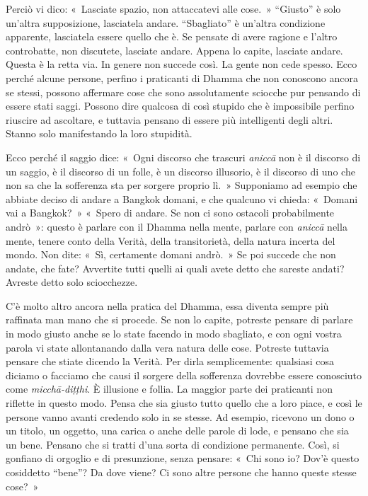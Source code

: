 Perciò vi dico: «~Lasciate spazio, non attaccatevi alle cose.~»
``Giusto'' è solo un'altra supposizione, lasciatela andare.
``Sbagliato'' è un'altra condizione apparente, lasciatela essere quello
che è. Se pensate di avere ragione e l'altro controbatte, non discutete,
lasciate andare. Appena lo capite, lasciate andare. Questa è la retta
via. In genere non succede così. La gente non cede spesso. Ecco perché
alcune persone, perfino i praticanti di Dhamma che non conoscono ancora
se stessi, possono affermare cose che sono assolutamente sciocche pur
pensando di essere stati saggi. Possono dire qualcosa di così stupido
che è impossibile perfino riuscire ad ascoltare, e tuttavia pensano di
essere più intelligenti degli altri. Stanno solo manifestando la loro
stupidità.

Ecco perché il saggio dice: «~Ogni discorso che trascuri \emph{aniccā}
non è il discorso di un saggio, è il discorso di un folle, è un discorso
illusorio, è il discorso di uno che non sa che la sofferenza sta per
sorgere proprio lì.~» Supponiamo ad esempio che abbiate deciso di andare
a Bangkok domani, e che qualcuno vi chieda: «~Domani vai a Bangkok?~»
«~Spero di andare. Se non ci sono ostacoli probabilmente andrò~»: questo
è parlare con il Dhamma nella mente, parlare con \emph{aniccā} nella
mente, tenere conto della Verità, della transitorietà, della natura
incerta del mondo. Non dite: «~Sì, certamente domani andrò.~» Se poi
succede che non andate, che fate? Avvertite tutti quelli ai quali avete
detto che sareste andati? Avreste detto solo sciocchezze.

C'è molto altro ancora nella pratica del Dhamma, essa diventa sempre più
raffinata man mano che si procede. Se non lo capite, potreste pensare di
parlare in modo giusto anche se lo state facendo in modo sbagliato, e
con ogni vostra parola vi state allontanando dalla vera natura delle
cose. Potreste tuttavia pensare che stiate dicendo la Verità. Per dirla
semplicemente: qualsiasi cosa diciamo o facciamo che causi il sorgere
della sofferenza dovrebbe essere conosciuto come \emph{micchā-diṭṭhi}. È
illusione e follia. La maggior parte dei praticanti non riflette in
questo modo. Pensa che sia giusto tutto quello che a loro piace, e così
le persone vanno avanti credendo solo in se stesse. Ad esempio, ricevono
un dono o un titolo, un oggetto, una carica o anche delle parole di
lode, e pensano che sia un bene. Pensano che si tratti d'una sorta di
condizione permanente. Così, si gonfiano di orgoglio e di presunzione,
senza pensare: «~Chi sono io? Dov'è questo cosiddetto ``bene''? Da dove
viene? Ci sono altre persone che hanno queste stesse cose?~»

